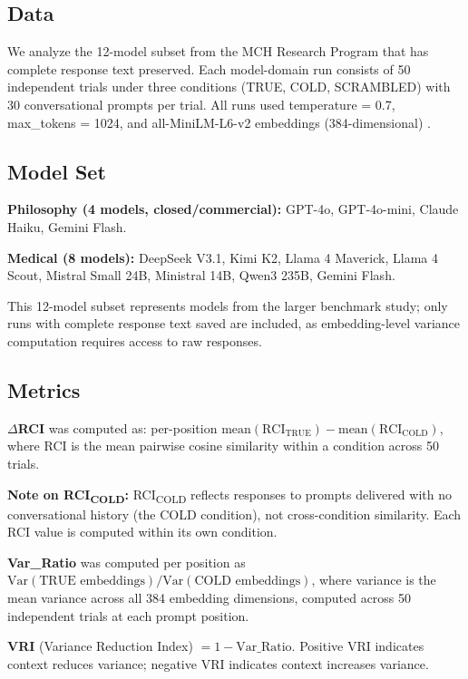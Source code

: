 \documentclass[twoside,11pt]{article}
\begin{document}
\subsection{Data}

We analyze the 12-model subset from the MCH Research Program that has complete response text preserved. Each model-domain run consists of 50 independent trials under three conditions (TRUE, COLD, SCRAMBLED) with 30 conversational prompts per trial. All runs used temperature = 0.7, max\_tokens = 1024, and all-MiniLM-L6-v2 embeddings (384-dimensional) \citep{reimers2019sentence}.

\subsection{Model Set}

\textbf{Philosophy (4 models, closed/commercial):}
GPT-4o, GPT-4o-mini, Claude Haiku, Gemini Flash.

\textbf{Medical (8 models):}
DeepSeek V3.1, Kimi K2, Llama 4 Maverick, Llama 4 Scout, Mistral Small 24B,
Ministral 14B, Qwen3 235B, Gemini Flash.

This 12-model subset represents models from the larger benchmark study; only runs with complete response text saved are included, as embedding-level variance computation requires access to raw responses.

\subsection{Metrics}

\textbf{$\Delta$RCI} was computed as: per-position $\text{mean}(\text{RCI}_{\text{TRUE}}) - \text{mean}(\text{RCI}_{\text{COLD}})$, where RCI is the mean pairwise cosine similarity within a condition across 50 trials.

\textbf{Note on RCI\textsubscript{COLD}:} RCI\textsubscript{COLD} reflects responses to prompts delivered with no conversational history (the COLD condition), not cross-condition similarity. Each RCI value is computed within its own condition.

\textbf{Var\_Ratio} was computed per position as $\text{Var}(\text{TRUE embeddings}) / \text{Var}(\text{COLD embeddings})$, where variance is the mean variance across all 384 embedding dimensions, computed across 50 independent trials at each prompt position.

\textbf{VRI} (Variance Reduction Index) $= 1 - \text{Var\_Ratio}$. Positive VRI indicates context reduces variance; negative VRI indicates context increases variance.
\end{document}
